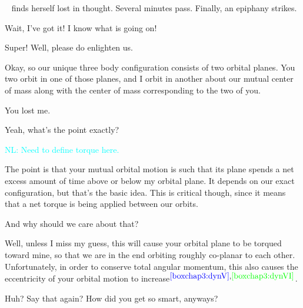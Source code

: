 \documentclass[main.tex]{subfiles}
\begin{document}
\par \nar \rmcelaeno~ finds herself lost in thought.  Several minutes pass.  Finally, an epiphany strikes.

\par \Celaeno  Wait, I've got it!  I know what is going on!

\par \Taygete  Super!  Well, please do enlighten us.

\par \Celaeno  Okay, so our unique three body configuration consists of two orbital planes.  You two orbit in one of those planes, and I orbit in another about our mutual center of mass along with the center of mass corresponding to the two of you.

\par \Alcyone  You lost me.

\par \Taygete Yeah, what's the point exactly?

\textcolor{cyan}{NL:  Need to define torque here.}
\par \Celaeno The point is that your mutual orbital motion is such that its plane spends a net excess amount of time above or below my orbital plane.  It depends on our exact configuration, but that's the basic idea.  This is critical though, since it means that a net torque is being applied between our orbits.




\par \Alcyone And why should we care about that?

\par \Celaeno Well, unless I miss my guess, this will cause your orbital plane to be torqued toward mine, so that we are in the end orbiting roughly co-planar to each other.  Unfortunately, in order to conserve total angular momentum, this also causes the eccentricity of your orbital motion to increase$^{\textcolor{blue}{\ref{boxchap3:dynV}},\textcolor{green}{\ref{boxchap3:dynVI}}}$.  

\par \Taygete  Huh?  Say that again?  How did you get so smart, anyways?
\end{document}
